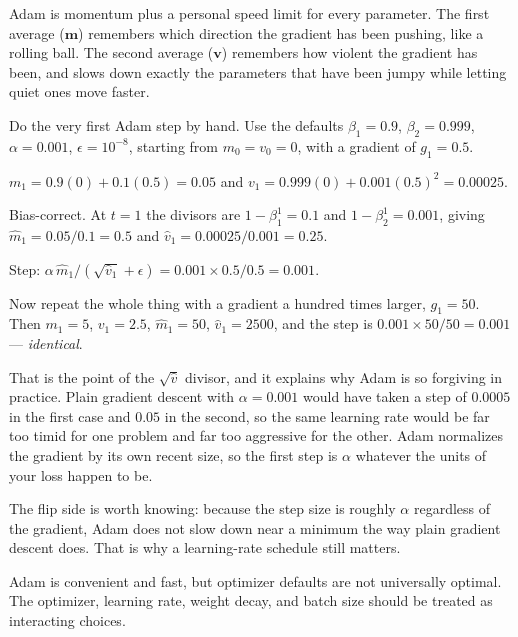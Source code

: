 \begin{intuition}
Adam is momentum plus a personal speed limit for every parameter. The first average ($\bm{m}$) remembers which direction the gradient has been pushing, like a rolling ball. The second average ($\bm{v}$) remembers how violent the gradient has been, and slows down exactly the parameters that have been jumpy while letting quiet ones move faster.
\end{intuition}

\begin{workedexample}
Do the very first Adam step by hand. Use the defaults $\beta_1=0.9$, $\beta_2=0.999$, $\alpha=0.001$, $\epsilon=10^{-8}$, starting from $m_0=v_0=0$, with a gradient of $g_1=0.5$.

\begin{mlsteps}
  \item $m_1=0.9(0)+0.1(0.5)=0.05$ and $v_1=0.999(0)+0.001{(0.5)}^2=0.00025$.
  \item Bias-correct. At $t=1$ the divisors are $1-\beta_1^1=0.1$ and $1-\beta_2^1=0.001$, giving
  $\hat{m}_1=0.05/0.1=0.5$ and $\hat{v}_1=0.00025/0.001=0.25$.
  \item Step: $\alpha\,\hat{m}_1/(\sqrt{\hat{v}_1}+\epsilon)=0.001\times 0.5/0.5=0.001$.
\end{mlsteps}

Now repeat the whole thing with a gradient a hundred times larger, $g_1=50$. Then $m_1=5$, $v_1=2.5$, $\hat{m}_1=50$, $\hat{v}_1=2500$, and the step is $0.001\times 50/50=0.001$ --- \emph{identical}.

That is the point of the $\sqrt{\hat{v}}$ divisor, and it explains why Adam is so forgiving in practice. Plain gradient descent with $\alpha=0.001$ would have taken a step of $0.0005$ in the first case and $0.05$ in the second, so the same learning rate would be far too timid for one problem and far too aggressive for the other. Adam normalizes the gradient by its own recent size, so the first step is $\alpha$ whatever the units of your loss happen to be.

The flip side is worth knowing: because the step size is roughly $\alpha$ regardless of the gradient, Adam does not slow down near a minimum the way plain gradient descent does. That is why a learning-rate schedule still matters.
\end{workedexample}

Adam is convenient and fast, but optimizer defaults are not universally optimal. The optimizer, learning rate, weight decay, and batch size should be treated as interacting choices.

